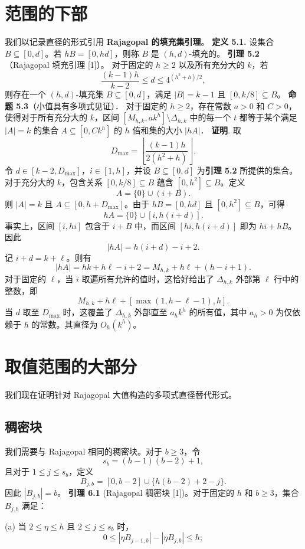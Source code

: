 \documentclass[11pt]{article}
\theoremstyle{break}
\begin{document}
\section{范围的下部}
我们以记录直径的形式引用
\textbf{Rajagopal 的填充集引理}。
\textbf{定义 5.1.}
设集合 $B \subseteq [0, d]$。若 $hB = [0, hd]$，则称 $B$ 是 $(h, d)$-填充的。
\textbf{引理 5.2}（Rajagopal 填充引理 [1]）。
对于固定的 $h \ge 2$ 以及所有充分大的 $k$，若
\[
\frac{(k-1)h}{k-2} \le d \le 4^{(h^2+h)/2},
\]
则存在一个 $(h,d)$-填充集 $B \subseteq [0,d]$，满足 $|B| = k-1$ 且 $[0, k/8] \subseteq B$。
\textbf{命题 5.3}（小值具有多项式见证）．
对于固定的 $h \ge 2$，存在常数 $a > 0$ 和 $C > 0$，使得对于所有充分大的 $k$，区间 $[M_{h,k}, a k^h] \setminus \Delta_{h,k}$ 中的每一个 $t$ 都等于某个满足 $|A| = k$ 的集合 $A \subseteq [0, C k^h]$ 的 $h$ 倍和集的大小 $|hA|$．
\textbf{证明}. 取
\[ D_{\max} = \left\lfloor \frac{(k-1)h}{2(h^2+h)} \right\rfloor. \]
令 $d \in [k-2,D_{\max}]$，$i \in [1,h]$，并设 $B \subseteq [0,d]$ 为\textbf{引理 5.2} 所提供的集合。对于充分大的 $k$，包含关系 $[0,k/8] \subseteq B$ 蕴含 $[0,h^2] \subseteq B$。定义
\[ A = \{0\} \cup (i+B). \]
则 $|A| = k$ 且 $A \subseteq [0,h+D_{\max}]$。由于 $hB = [0,hd]$ 且 $[0,h^2] \subseteq B$，可得
\[ hA = \{0\} \cup [i,h(i+d)]. \]
事实上，区间 $[i, hi]$ 包含于 $i + B$ 中，而区间 $[hi, h(i + d)]$ 即为 $hi + hB$。
因此
\[ |hA| = h(i+d) - i + 2. \]
记 $i+d = k+\ell$。则有
\[ |hA| = hk + h\ell - i + 2 = M_{h,k} + h\ell + (h - i + 1). \]
对于固定的 $\ell$，当 $i$ 取遍所有允许的值时，这恰好给出了 $\Delta_{h,k}$ 外部第 $\ell$ 行中的整数，即
\[ M_{h,k} + h\ell + [\max(1, h-\ell-1), h]. \]
当 $d$ 取至 $D_{\max}$ 时，这覆盖了 $\Delta_{h,k}$ 外部直至 $a_h k^h$ 的所有值，其中 $a_h > 0$ 为仅依赖于 $h$ 的常数。其直径为 $O_h(k^h)$。
\section{取值范围的大部分}
我们现在证明针对 Rajagopal 大值构造的多项式直径替代形式。
\subsection{稠密块}
我们需要与 Rajagopal 相同的稠密块。对于 $b \ge 3$，令
\[ s_b = (h-1)(b-2)+1, \]
且对于 $1 \le j \le s_b$，定义
\[ B_{j,b} = [0,b-2] \cup \{h(b-2)+2-j\}. \]
因此 $|B_{j,b}| = b$。
\textbf{引理 6.1} (Rajagopal 稠密块 [1])。对于固定的 $h$ 和 $b \ge 3$，集合 $B_{j,b}$ 满足：

(a) 当 $2 \le \eta \le h$ 且 $2 \le j \le s_b$ 时，
\[ 0 \le |\eta B_{j-1,b}| - |\eta B_{j,b}| \le h; \]
\end{document}
